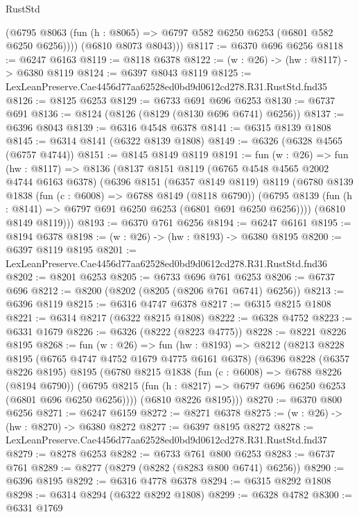 \begin{lexlean}{RustStd}
\begin{coremodule}
          (@6795 @8063 (fun (h : @8065) => @6797 @582 @6250 @6253 (@6801 @582 @6250 @6256))))
        (@6810 @8073 @8043)))
@8117 := @6370 @696 @6256
@8118 := @6247 @6163
@8119 := @8118 @6378
@8122 := (w : @26) -> (hw : @8117) -> @6380 @8119
@8124 := @6397 @8043 @8119
@8125 := LexLeanPreserve.Cae4456d77aa62528ed0bd9d0612cd278.R31.RustStd.fnd35
@8126 := @8125 @6253
@8129 := @6733 @691 @696 @6253
@8130 := @6737 @691
@8136 := @8124 (@8126 (@8129 (@8130 @696 @6741) @6256))
@8137 := @6396 @8043
@8139 := @6316 @4548 @6378
@8141 := @6315 @8139 @1808
@8145 := @6314 @8141 (@6322 @8139 @1808)
@8149 := @6326 (@6328 @4565 (@6757 @4744))
@8151 := @8145 @8149 @8119
@8191 := fun (w : @26) =>
  fun (hw : @8117) =>
  @8136
    (@8137
      @8151
      @8119
      (@6765 @4548 @4565 @2002 @4744 @6163 @6378)
      (@6396
        @8151
        (@6357 @8149 @8119)
        @8119
        (@6780
          @8139
          @1838
          (fun (c : @6008) => @6788 @8149 (@8118 @6790))
          (@6795 @8139 (fun (h : @8141) => @6797 @691 @6250 @6253 (@6801 @691 @6250 @6256))))
        (@6810 @8149 @8119)))
@8193 := @6370 @761 @6256
@8194 := @6247 @6161
@8195 := @8194 @6378
@8198 := (w : @26) -> (hw : @8193) -> @6380 @8195
@8200 := @6397 @8119 @8195
@8201 := LexLeanPreserve.Cae4456d77aa62528ed0bd9d0612cd278.R31.RustStd.fnd36
@8202 := @8201 @6253
@8205 := @6733 @696 @761 @6253
@8206 := @6737 @696
@8212 := @8200 (@8202 (@8205 (@8206 @761 @6741) @6256))
@8213 := @6396 @8119
@8215 := @6316 @4747 @6378
@8217 := @6315 @8215 @1808
@8221 := @6314 @8217 (@6322 @8215 @1808)
@8222 := @6328 @4752
@8223 := @6331 @1679
@8226 := @6326 (@8222 (@8223 @4775))
@8228 := @8221 @8226 @8195
@8268 := fun (w : @26) =>
  fun (hw : @8193) =>
  @8212
    (@8213
      @8228
      @8195
      (@6765 @4747 @4752 @1679 @4775 @6161 @6378)
      (@6396
        @8228
        (@6357 @8226 @8195)
        @8195
        (@6780
          @8215
          @1838
          (fun (c : @6008) => @6788 @8226 (@8194 @6790))
          (@6795 @8215 (fun (h : @8217) => @6797 @696 @6250 @6253 (@6801 @696 @6250 @6256))))
        (@6810 @8226 @8195)))
@8270 := @6370 @800 @6256
@8271 := @6247 @6159
@8272 := @8271 @6378
@8275 := (w : @26) -> (hw : @8270) -> @6380 @8272
@8277 := @6397 @8195 @8272
@8278 := LexLeanPreserve.Cae4456d77aa62528ed0bd9d0612cd278.R31.RustStd.fnd37
@8279 := @8278 @6253
@8282 := @6733 @761 @800 @6253
@8283 := @6737 @761
@8289 := @8277 (@8279 (@8282 (@8283 @800 @6741) @6256))
@8290 := @6396 @8195
@8292 := @6316 @4778 @6378
@8294 := @6315 @8292 @1808
@8298 := @6314 @8294 (@6322 @8292 @1808)
@8299 := @6328 @4782
@8300 := @6331 @1769

\end{coremodule}
\end{lexlean}
